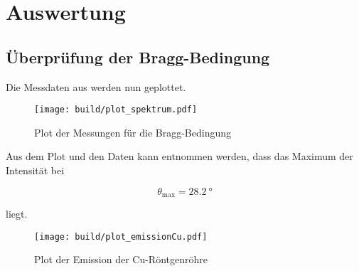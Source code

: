 \section{Auswertung}
\label{sec:Auswertung}



\subsection{Überprüfung der Bragg-Bedingung}
\label{sec:1}

Die Messdaten aus \label{tab:bragg} werden nun geplottet.

\begin{figure}
    \centering
    \texttt{[image: build/plot\_spektrum.pdf]}
    \caption{Plot der Messungen für die Bragg-Bedingung}
    \label{fig:bragg}
\end{figure}

Aus dem Plot und den Daten kann entnommen werden, dass das Maximum der Intensität bei 

\begin{equation}
    \theta _\text{max} = \SI{28.2}{\degree}
\end{equation}

liegt.

\begin{figure}
    \centering
    \texttt{[image: build/plot\_emissionCu.pdf]}
    \caption{Plot der Emission der Cu-Röntgenröhre}
    \label{fig:kupfer}
\end{figure}